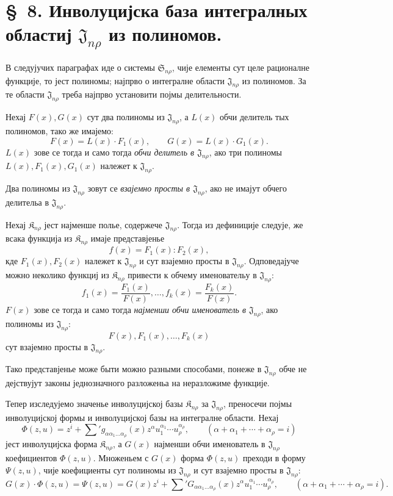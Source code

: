 ﻿\documentclass[11pt]{article}
\providecommand{\Kfield}{\mathfrak{K}}
\providecommand{\Ssys}{\mathfrak{S}}
\providecommand{\Jdom}{\mathfrak{J}}
\begin{document}
\section*{\S\ 8. Инволуцијска база интегралных областиј $\Jdom_{n\rho}$ из полиномов.}

В следујучих параграфах иде о системы $\Ssys_{n\rho}$, чије елементы сут целе рационалне функције, то јест полиномы; најпрво о интегралне области $\Jdom_{n\rho}$ из полиномов. За те области $\Jdom_{n\rho}$ треба најпрво установити појмы делительности.

Нехај $F(x),G(x)$ сут два полиномы из $\Jdom_{n\rho}$, а $L(x)$ обчи делитель тых полиномов, тако же имајемо:
\[
  F(x)=L(x)\cdot F_1(x),\qquad G(x)=L(x)\cdot G_1(x).
\]
$L(x)$ зове се тогда и само тогда {\itshape обчи делитель в $\Jdom_{n\rho}$}, ако три полиномы $L(x),F_1(x),G_1(x)$ належет к $\Jdom_{n\rho}$.

Два полиномы из $\Jdom_{n\rho}$ зовут се {\itshape взајемно просты в $\Jdom_{n\rho}$}, ако не имајут обчего делительа в $\Jdom_{n\rho}$.

Нехај $\Kfield_{n\rho}$ јест најменше полье, содержече $\Jdom_{n\rho}$. Тогда из дефиниције следује, же всака функција из $\Kfield_{n\rho}$ имаје представјенье
\[
  f(x)=F_1(x):F_2(x),
\]
кде $F_1(x),F_2(x)$ належет к $\Jdom_{n\rho}$ и сут взајемно просты в $\Jdom_{n\rho}$. Одповедајуче можно неколико функциј из $\Kfield_{n\rho}$ привести к обчему именовательу в $\Jdom_{n\rho}$:
\[
  f_1(x)=\frac{F_1(x)}{F(x)},\ldots,
  f_k(x)=\frac{F_k(x)}{F(x)}.
\]
$F(x)$ зове се тогда и само тогда {\itshape најменши обчи именователь в $\Jdom_{n\rho}$}, ако полиномы из $\Jdom_{n\rho}$:
\[
  F(x),F_1(x),\ldots,F_k(x)
\]
сут взајемно просты в $\Jdom_{n\rho}$.

Тако представјенье може быти можно разными способами, понеже в $\Jdom_{n\rho}$ обче не дејствујут законы једнозначного разложеньа на неразложиме функције.

Тепер изследујемо значенье инволуцијској базы $\Kfield_{n\rho}$ за $\Jdom_{n\rho}$, преносечи појмы инволуцијској формы и инволуцијској базы на интегралне области. Нехај
\[
  \Phi(z,u)=z^i+\sum{}' g_{\alpha\alpha_1\ldots\alpha_\rho}(x)
  z^\alpha u_1^{\alpha_1}\cdots u_\rho^{\alpha_\rho},
  \qquad
  (\alpha+\alpha_1+\cdots+\alpha_\rho=i)
\]
јест инволуцијска форма $\Kfield_{n\rho}$, а $G(x)$ најменши обчи именователь в $\Jdom_{n\rho}$ коефициентов $\Phi(z,u)$. Множеньем с $G(x)$ форма $\Phi(z,u)$ преходи в форму $\Psi(z,u)$, чије коефициенты сут полиномы из $\Jdom_{n\rho}$ и сут взајемно просты в $\Jdom_{n\rho}$:
\[
  G(x)\cdot\Phi(z,u)=\Psi(z,u)
  =G(x)z^i+
  \sum{}' G_{\alpha\alpha_1\ldots\alpha_\rho}(x)
  z^\alpha u_1^{\alpha_1}\cdots u_\rho^{\alpha_\rho},
  \qquad
  (\alpha+\alpha_1+\cdots+\alpha_\rho=i).
\]
\end{document}
